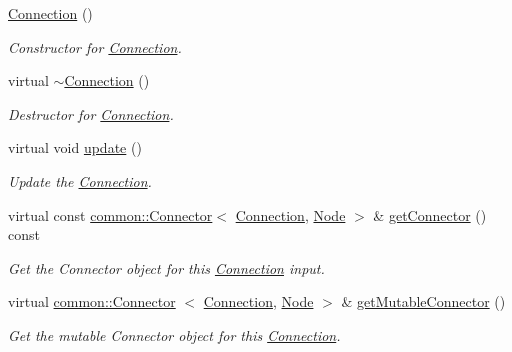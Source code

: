\begin{DoxyCompactItemize}
\item 
\hyperlink{classcryomesh_1_1components_1_1Connection_a4b779dbd6303cab9351375feb89046ff}{\-Connection} ()
\begin{DoxyCompactList}\small\item\em \-Constructor for \hyperlink{classcryomesh_1_1components_1_1Connection}{\-Connection}. \end{DoxyCompactList}\item 
virtual \hyperlink{classcryomesh_1_1components_1_1Connection_a0fe48902242a29c73effddfd9250de32}{$\sim$\-Connection} ()
\begin{DoxyCompactList}\small\item\em \-Destructor for \hyperlink{classcryomesh_1_1components_1_1Connection}{\-Connection}. \end{DoxyCompactList}\item 
virtual void \hyperlink{classcryomesh_1_1components_1_1Connection_acb0d89bb9d8f2e2a808f7181c308c267}{update} ()
\begin{DoxyCompactList}\small\item\em \-Update the \hyperlink{classcryomesh_1_1components_1_1Connection}{\-Connection}. \end{DoxyCompactList}\item 
virtual const \*
\hyperlink{classcryomesh_1_1common_1_1Connector}{common\-::\-Connector}$<$ \hyperlink{classcryomesh_1_1components_1_1Connection}{\-Connection}, \*
\hyperlink{classcryomesh_1_1components_1_1Node}{\-Node} $>$ \& \hyperlink{classcryomesh_1_1components_1_1Connection_ad3a94443297c27fc9d52be81afb408e8}{get\-Connector} () const 
\begin{DoxyCompactList}\small\item\em \-Get the \-Connector object for this \hyperlink{classcryomesh_1_1components_1_1Connection}{\-Connection} input. \end{DoxyCompactList}\item 
virtual \hyperlink{classcryomesh_1_1common_1_1Connector}{common\-::\-Connector}\*
$<$ \hyperlink{classcryomesh_1_1components_1_1Connection}{\-Connection}, \hyperlink{classcryomesh_1_1components_1_1Node}{\-Node} $>$ \& \hyperlink{classcryomesh_1_1components_1_1Connection_a106759b683be9446b519eb8e3e75866e}{get\-Mutable\-Connector} ()
\begin{DoxyCompactList}\small\item\em \-Get the mutable \-Connector object for this \hyperlink{classcryomesh_1_1components_1_1Connection}{\-Connection}. \end{DoxyCompactList}\item 

\end{DoxyCompactItemize}
